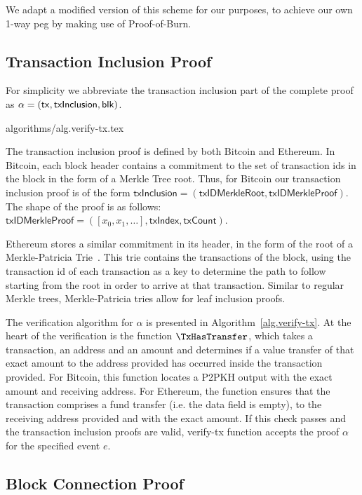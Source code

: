 We adapt a modified version of this scheme for our purposes, to achieve our own 1-way peg by making use of Proof-of-Burn.

\subsection{Transaction Inclusion Proof}

For simplicity we abbreviate the transaction inclusion part of the complete proof as $\alpha = \sf(tx, txInclusion, blk)$.

{algorithms/alg.verify-tx.tex}

The transaction inclusion proof is defined by both Bitcoin and Ethereum. In Bitcoin, each block header contains a commitment to the set of transaction ids in the block in the form of a Merkle Tree root. Thus, for Bitcoin our transaction inclusion proof is of the form $\mathsf{txInclusion} = (\mathsf{txIDMerkleRoot}, \mathsf{txIDMerkleProof})$. The shape of the proof is as follows: $\mathsf{txIDMerkleProof} = ([x_0, x_1, \dots], \mathsf{txIndex}, \mathsf{txCount})$.

Ethereum stores a similar commitment in its header, in the form of the root of a Merkle-Patricia Trie~\cite{wood2014ethereum}. This trie contains the transactions of the block, using the transaction id of each transaction as a key to determine the path to follow starting from the root in order to arrive at that transaction. Similar to regular Merkle trees, Merkle-Patricia tries allow for leaf inclusion proofs.

The verification algorithm for $\alpha$ is presented in Algorithm~\ref{alg.verify-tx}. At the heart of the verification is the function $\TxHasTransfer$, which takes a transaction, an address and an amount and determines if a value transfer of that exact amount to the address provided has occurred inside the transaction provided. For Bitcoin, this function locates a P2PKH output with the exact amount and receiving address. For Ethereum, the function ensures that the transaction comprises a fund transfer (i.e. the \textsf{data} field is empty), to the receiving address provided and with the exact amount. If this check passes and the transaction inclusion proofs are valid, \textsf{verify-tx} function accepts the proof $\alpha$ for the specified event $e$.

\subsection{Block Connection Proof}

